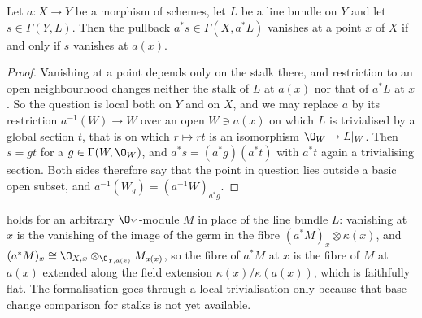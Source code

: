 \begin{lemma}
\label{lem:deg-vanishing-pullback}
\leanok
Let $a\colon X\to Y$ be a morphism of schemes, let $L$ be a line bundle on $Y$
and let $s\in\Gamma(Y,L)$.  Then the pullback $a^*s\in\Gamma(X,a^*L)$ vanishes
at a point $x$ of $X$ if and only if $s$ vanishes at $a(x)$.
\end{lemma}
\begin{proof}
\leanok
Vanishing at a point depends only on the stalk there, and restriction to an
open neighbourhood changes neither the stalk of $L$ at $a(x)$ nor that of
$a^*L$ at $x$.  So the question is local both on $Y$ and on $X$, and we may
replace $a$ by its restriction $a^{-1}(W)\to W$ over an open $W\ni a(x)$ on
which $L$ is trivialised by a global section $t$, that is on which
$r\mapsto rt$ is an isomorphism $\O_W\to L|_W$.  Then $s=gt$ for a
$g\in\Gamma(W,\O_W)$, and $a^*s=(a^*g)(a^*t)$ with $a^*t$ again a trivialising
section.  Both sides therefore say that the point in question lies outside a
basic open subset, and $a^{-1}(W_g)=(a^{-1}W)_{a^*g}$.
\end{proof}

\begin{remark}
\label{rem:deg-vanishing-pullback-general}
 holds for an arbitrary $\O_Y$-module $M$ in
place of the line bundle $L$: vanishing at $x$ is the vanishing of the image
of the germ in the fibre $(a^*M)_x\otimes\kappa(x)$, and
$(a^*M)_x\cong\O_{X,x}\otimes_{\O_{Y,a(x)}}M_{a(x)}$, so the fibre of $a^*M$ at
$x$ is the fibre of $M$ at $a(x)$ extended along the field extension
$\kappa(x)/\kappa(a(x))$, which is faithfully flat.  The formalisation goes
through a local trivialisation only because that base-change comparison for
stalks is not yet available.
\end{remark}


